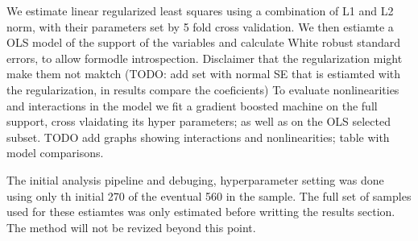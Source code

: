 We estimate linear regularized least squares using a combination of L1 and L2 norm, with their parameters set by 5 fold cross validation. 
We then estiamte a OLS model of the support of the variables and calculate White robust standard errors, to allow formodle introspection. 
Disclaimer that the regularization might make them not maktch (TODO: add set with normal SE that is estiamted with the regularization, in results compare the coeficients) 
To evaluate nonlinearities and interactions  in the model we fit a gradient boosted machine on the full support, cross vlaidating its hyper parameters; as well as on the OLS selected subset.  TODO add graphs showing interactions and nonlinearities; table with model comparisons.


The initial analysis pipeline and debuging, hyperparameter setting was done using only th initial 270 of the eventual 560 in the sample. The full set of samples used for these estiamtes was only estimated before writting the results section. The method will not be revized beyond this point.
